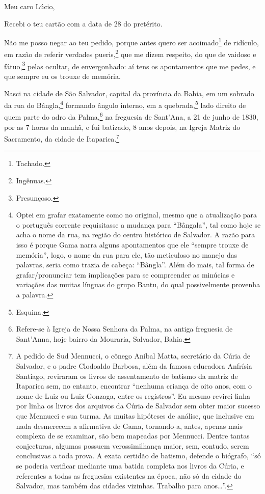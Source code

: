 Meu caro Lúcio,

Recebi o teu cartão com a data de 28 do pretérito.

Não me posso negar ao teu pedido, porque antes quero ser
acoimado\footnote{Tachado.} de ridículo, em razão de referir verdades
pueris,\footnote{Ingênuas.} que me dizem respeito, do que de vaidoso e
fátuo,\footnote{Presunçoso.} pelas ocultar, de envergonhado: aí tens
os apontamentos que me pedes, e que sempre eu os trouxe de memória.

Nasci na cidade de São Salvador, capital da província da Bahia, em um
sobrado da rua do Bângla,\footnote{Optei em grafar exatamente como no
  original, mesmo que a atualização para o português corrente
  requisitasse a mudança para ``Bângala'', tal como hoje se acha o nome da
  rua, na região do centro histórico de Salvador. A razão para isso é
  porque Gama narra alguns apontamentos que ele ``sempre trouxe de
  memória'', logo, o nome da rua para ele, tão meticuloso no manejo das
  palavras, seria como trazia de cabeça: ``Bângla''. Além do mais, tal
  forma de grafar/pronunciar tem implicações para se compreender as
  minúcias e variações das muitas línguas do grupo Bantu, do qual
  possivelmente provenha a palavra.} formando ângulo interno, em a
quebrada,\footnote{Esquina.} lado direito de quem parte do adro da 
Palma,\footnote{Refere-se à Igreja de Nossa Senhora da Palma, na antiga
  freguesia de Sant'Anna, hoje bairro da Mouraria, Salvador, Bahia.} na
freguesia de Sant'Ana, a 21 de junho de 1830, por as 7 horas da manhã, e
fui batizado, 8 anos depois, na Igreja Matriz do Sacramento, da cidade
de Itaparica.\footnote{A pedido de Sud Mennucci, o cônego Aníbal Matta, \label{mennucci}
  secretário da Cúria de Salvador, e o padre Clodoaldo Barbosa, além da 
  famosa educadora Anfrísia Santiago, reviraram os livros de
  assentamento de batismo da matriz de Itaparica sem, no entanto,
  encontrar ``nenhuma criança de oito anos, com o nome de Luiz ou Luiz
  Gonzaga, entre os registros''. Eu mesmo revirei linha por linha os
  livros dos arquivos da Cúria de Salvador sem obter maior sucesso que
  Mennucci e sua turma. As muitas hipóteses de análise, que inclusive em
  nada desmerecem a afirmativa de Gama, tornando-a, antes, apenas mais
  complexa de se examinar, são bem mapeadas por Mennucci. Dentre tantas
  conjecturas, algumas possuem verossimilhança maior, sem, contudo,
  serem conclusivas a toda prova. A exata certidão de batismo, defende o
  biógrafo, ``só se poderia verificar mediante uma batida completa nos
  livros da Cúria, e referentes a todas as freguesias existentes na
  época, não só da cidade do Salvador, mas também das cidades vizinhas.
  Trabalho para anos\ldots{}''.}

